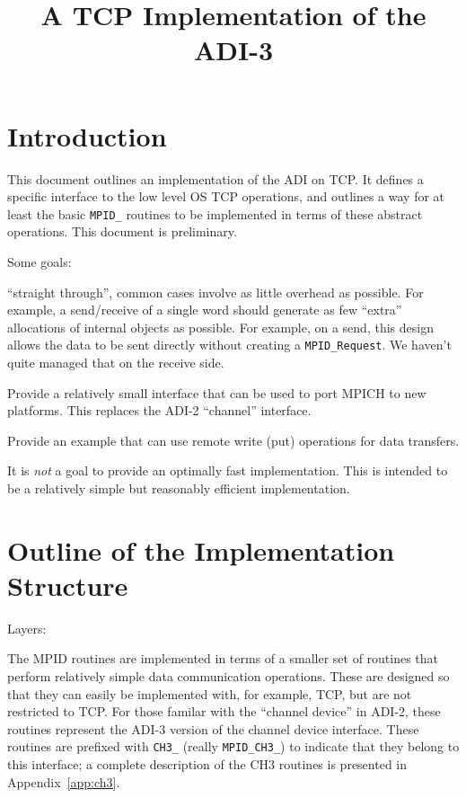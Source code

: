 \documentclass{article}
\def\code{\begingroup\makeustext\eatcode}
\def\eatcode#1{\texttt{#1}\endgroup}
\begin{document}
\title{A TCP Implementation of the ADI-3}
\author{}
\maketitle

\begin{abstract}

\end{abstract}

\section{Introduction}
This document outlines an implementation of the ADI on TCP.  It defines a
specific interface to the low level OS TCP operations, and outlines a way
for at least the basic \code{MPID_} routines to be implemented in terms of
these 
abstract operations.  This document is preliminary.

Some goals:

``straight through'', common cases involve as little overhead as possible.
For example, a send/receive of a single word should generate as few ``extra''
allocations of internal objects as possible.  For example, on a send, this
design allows the data to be sent directly without creating a
\code{MPID_Request}. We haven't quite managed that on the receive side.

Provide a relatively small interface that can be used to port MPICH to new
platforms.  This replaces the ADI-2 ``channel'' interface.

Provide an example that can use remote write (put) operations for data
transfers.  

It is \emph{not} a goal to provide an optimally fast implementation. This is
intended to be a relatively simple but reasonably efficient implementation.

\section{Outline of the Implementation Structure}

Layers: 

The MPID routines are implemented in terms of a smaller set of routines that
perform relatively simple data communication operations.  These are designed
so that they can easily be implemented with, for example, TCP, but are not
restricted to TCP.  For those familar with the ``channel device'' in ADI-2,
these routines represent the ADI-3 version of the channel device interface.
These routines are prefixed with \code{CH3_} (really \code{MPID_CH3_}) to
indicate that they belong to 
this interface; a complete description of the CH3 routines is presented in
Appendix~\ref{app:ch3}. 
\end{document}
